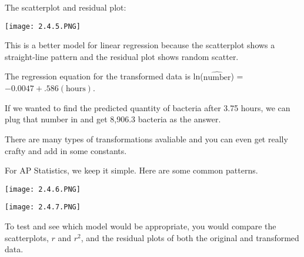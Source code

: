 \documentclass[../stats.tex]{subfiles}
\begin{document}
\begin{example}
    The scatterplot and residual plot:
    \begin{center}
        \texttt{[image: 2.4.5.PNG]}
    \end{center}

    This is a better model for linear regression because the scatterplot shows a straight-line pattern and the residual plot shows random scatter.

    The regression equation for the transformed data is ln($\hat{\text{number}}$) = $-0.0047+.586(\text{hours})$. 

    If we wanted to find the predicted quantity of bacteria after 3.75 hours, we can plug that number in and get 8,906.3 bacteria as the answer.
\end{example}

There are many types of transformations avaliable and you can even get really crafty and add in some constants.

For AP Statistics, we keep it simple. Here are some common patterns.
\begin{center}
    \texttt{[image: 2.4.6.PNG]}
\end{center}
\begin{center}
    \texttt{[image: 2.4.7.PNG]}
\end{center}
To test and see which model would be appropriate, you would compare the scatterplots, $r$ and $r^2$, and the residual plots of both the original and transformed data.
\end{document}
